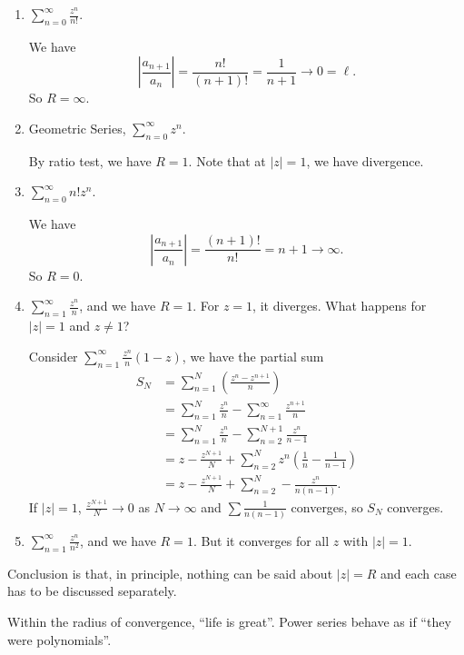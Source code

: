 \begin{example}
    \begin{enumerate}
        \item \(\sum\limits_{n=0}^{\infty} \frac{z^n}{n!}\).
        
        We have
        \[
            \left\vert \frac{a_{n+1}}{a_n} \right\vert = \frac{n!}{(n+1)!} = \frac{1}{n + 1} \to 0 = \ell.
        \]
        So \(R = \infty \).
        \item Geometric Series, \(\sum\limits_{n=0}^{\infty} z^n\).
        
        By ratio test, we have \(R = 1\). Note that at \(\left\vert z \right\vert = 1\), we have divergence.
        \item \(\sum\limits_{n=0}^{\infty} n!z^n\).

        We have
        \[
            \left\vert \frac{a_{n+1}}{a_n} \right\vert = \frac{(n+1)!}{n!} = n + 1 \to \infty.
        \]
        So \(R = 0\).
        \item \(\sum\limits_{n=1}^{\infty} \frac{z^n}{n}\), and we have \(R = 1\). For \(z = 1\), it diverges. What happens for \(\left\vert z \right\vert = 1\) and \(z \neq 1\)?
        
        Consider \(\sum\limits_{n=1}^{\infty} \frac{z^n}{n}(1-z)\), we have the partial sum
        \begin{align*}
            S_N &= \sum\limits_{n=1}^{N} (\frac{z^n - z^{n+1}}{n})\\
            &= \sum\limits_{n=1}^{N} \frac{z^n}{n} - \sum\limits_{n=1}^{\infty} \frac{z^{n+1}}{n}\\
            &= \sum\limits_{n=1}^{N} \frac{z^n}{n} - \sum\limits_{n=2}^{N+1} \frac{z^n}{n - 1}\\
            &= z - \frac{z^{N + 1}}{N} + \sum\limits_{n=2}^{N} z^n (\frac{1}{n} - \frac{1}{n - 1})\\
            &= z - \frac{z^{N + 1}}{N} + \sum\limits_{n=2}^{N} -\frac{z^n}{n(n-1)}.
        \end{align*}
        If \(\left\vert z \right\vert = 1\), \(\frac{z^{N + 1}}{N} \to 0\) as \(N \to \infty \) and \(\sum \frac{1}{n(n - 1)}\) converges, so \(S_N\) converges.
        \item \(\sum\limits_{n=1}^{\infty} \frac{z^n}{n^2}\), and we have \(R = 1\). But it converges for all \(z\) with \(\left\vert z \right\vert = 1\).
    \end{enumerate}
\end{example}
Conclusion is that, in principle, nothing can be said about \(\left\vert z \right\vert = R\) and each case has to be discussed separately.

Within the radius of convergence, ``life is great''. Power series behave as if ``they were polynomials''.
